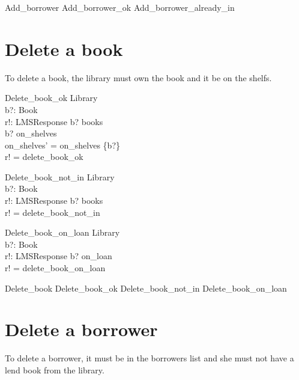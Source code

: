 \documentclass[11pt, fuzz]{article}
\begin{document}
\begin{zed}
    Add\_borrower  Add\_borrower\_ok \lor Add\_borrower\_already\_in
\end{zed}

\section{Delete a book}

To delete a book, the library must own the book and it be on the shelfs.

\begin{schema}{Delete\_book\_ok}
    \Delta Library  \\
    b?: Book        \\
    r!: LMSResponse
\where
    b? \in books                                \\
    b? \in on\_shelves                          \\
    on\_shelves' = on\_shelves \setminus \{b?\} \\
    r! = delete\_book\_ok
\end{schema}

\begin{schema}{Delete\_book\_not\_in}
    \Xi Library     \\
    b?: Book        \\
    r!: LMSResponse
\where
    b? \notin books            \\
    r! = delete\_book\_not\_in \\
\end{schema}

\begin{schema}{Delete\_book\_on\_loan}
    \Xi Library     \\
    b?: Book        \\
    r!: LMSResponse
\where
    b? \in on\_loan             \\
    r! = delete\_book\_on\_loan \\
\end{schema}

\begin{zed}
    Delete\_book  Delete\_book\_ok \lor Delete\_book\_not\_in \lor Delete\_book\_on\_loan
\end{zed}


\section{Delete a borrower}

To delete a borrower, it must be in the borrowers list and she must not have a lend book from the library. 
\end{document}
